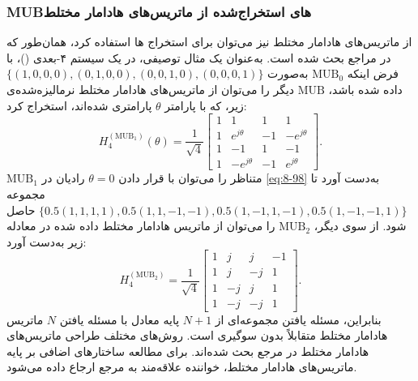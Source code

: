 \subsubsection{MUBهای استخراج‌شده از ماتریس‌های هادامار مختلط}
\label{subsec:8-4-1-5}
از ماتریس‌های هادامار مختلط نیز می‌توان برای استخراج ها استفاده کرد، همان‌طور که در مراجع \cite{8-31, 8-78} بحث شده است. به‌عنوان یک مثال توصیفی، در یک سیستم ۴-بعدی ()، با فرض اینکه $\text{MUB}_0$ به‌صورت $\{(1, 0, 0, 0), (0, 1, 0, 0), (0, 0, 1, 0), (0, 0, 0, 1)\}$ داده شده باشد، $\text{MUB}$ دیگر را می‌توان از ماتریس‌های هادامار مختلط نرمالیزه‌شده‌ی زیر، که با پارامتر $\theta$ پارامتری شده‌اند، استخراج کرد:
\begin{equation}
	H_4^{(\text{MUB}_1)}(\theta) = \frac{1}{\sqrt{4}} \begin{bmatrix} 1 & 1 & 1 & 1 \\ 1 & e^{j\theta} & -1 & -e^{j\theta} \\ 1 & -1 & 1 & -1 \\ 1 & -e^{j\theta} & -1 & e^{j\theta} \end{bmatrix}.
	\label{eq:8-98}
\end{equation}
$\text{MUB}_1$ متناظر را می‌توان با قرار دادن $\theta = 0$ رادیان در \eqref{eq:8-98} به‌دست آورد تا مجموعه $\{0.5(1, 1, 1, 1), 0.5(1, 1, -1, -1), 0.5(1, -1, 1, -1), 0.5(1, -1, -1, 1)\}$ حاصل شود. از سوی دیگر، $\text{MUB}_2$ را می‌توان از ماتریس هادامار مختلط داده شده در معادله زیر به‌دست آورد:
\begin{equation}
	H_4^{(\text{MUB}_2)} = \frac{1}{\sqrt{4}} \begin{bmatrix} 1 & j & j & -1 \\ 1 & j & -j & 1 \\ 1 & -j & j & 1 \\ 1 & -j & -j & 1 \end{bmatrix}.
	\label{eq:8-99}
\end{equation}
بنابراین، مسئله یافتن مجموعه‌ای از $N+1$ پایه  معادل با مسئله یافتن $N$ ماتریس هادامار مختلط متقابلاً بدون سوگیری است. روش‌های مختلف طراحی ماتریس‌های هادامار مختلط در مرجع \cite{8-85} بحث شده‌اند. برای مطالعه ساختارهای اضافی  بر پایه ماتریس‌های هادامار مختلط، خواننده علاقه‌مند به مرجع \cite{8-78} ارجاع داده می‌شود.

